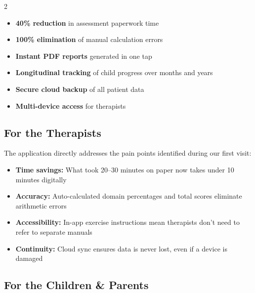 \documentclass[11pt,a4paper]{article}
\begin{document}
\begin{highlightbox}
\begin{multicols}{2}
\begin{itemize}[leftmargin=1.5em, itemsep=4pt]
    \item[\color{clinicalteal}\textbf{$\downarrow$}] \textbf{40\% reduction} in assessment paperwork time
    \item[\color{clinicalteal}\textbf{$\uparrow$}] \textbf{100\% elimination} of manual calculation errors
    \item[\color{clinicalteal}\textbf{$\uparrow$}] \textbf{Instant PDF reports} generated in one tap
    \item[\color{clinicalteal}\textbf{$\uparrow$}] \textbf{Longitudinal tracking} of child progress over months and years
    \item[\color{clinicalteal}\textbf{$\uparrow$}] \textbf{Secure cloud backup} of all patient data
    \item[\color{clinicalteal}\textbf{$\uparrow$}] \textbf{Multi-device access} for therapists
\end{itemize}
\end{multicols}
\end{highlightbox}

\subsection{For the Therapists}

The application directly addresses the pain points identified during our first visit:
\begin{itemize}[leftmargin=2em]
    \item \textbf{Time savings:} What took 20--30 minutes on paper now takes under 10 minutes digitally
    \item \textbf{Accuracy:} Auto-calculated domain percentages and total scores eliminate arithmetic errors
    \item \textbf{Accessibility:} In-app exercise instructions mean therapists don't need to refer to separate manuals
    \item \textbf{Continuity:} Cloud sync ensures data is never lost, even if a device is damaged
\end{itemize}

\subsection{For the Children \& Parents}
\end{document}
